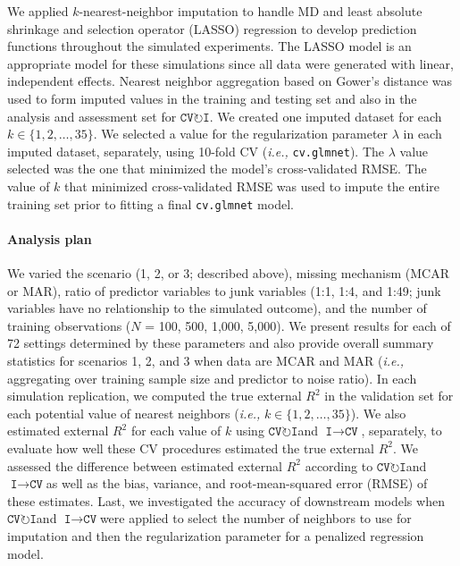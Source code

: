 \documentclass[AMA,STIX1COL,doublespace]{WileyNJD-v2}
\begin{document}
We applied \(k\)-nearest-neighbor imputation to handle MD and least
absolute shrinkage and selection operator (LASSO) regression to develop
prediction functions throughout the simulated
experiments.\cite{tibshirani1996regression} The LASSO model is an
appropriate model for these simulations since all data were generated
with linear, independent effects. Nearest neighbor aggregation based on
Gower's distance was used to form imputed values in the training and
testing set and also in the analysis and assessment set for
$\texttt{CV}\!\circlearrowright\!\texttt{I}$.\cite{gower1971general} We
created one imputed dataset for each
\(k \in \lbrace 1, 2, \ldots, 35\rbrace\). We selected a value for the
regularization parameter \(\lambda\) in each imputed dataset,
separately, using 10-fold CV
(\textit{i.e., }\texttt{cv.glmnet}).\cite{glmnet} The \(\lambda\) value
selected was the one that minimized the model's cross-validated RMSE.
The value of \(k\) that minimized cross-validated RMSE was used to
impute the entire training set prior to fitting a final
\texttt{cv.glmnet} model.

\paragraph{Analysis plan}

We varied the scenario (1, 2, or 3; described above), missing mechanism
(MCAR or MAR), ratio of predictor variables to junk variables (1:1, 1:4,
and 1:49; junk variables have no relationship to the simulated outcome),
and the number of training observations (\(N\) = 100, 500, 1,000,
5,000). We present results for each of 72 settings determined by these
parameters and also provide overall summary statistics for scenarios 1,
2, and 3 when data are MCAR and MAR (\textit{i.e., }aggregating over
training sample size and predictor to noise ratio). In each simulation
replication, we computed the true external \(R^2\) in the validation set
for each potential value of nearest neighbors
(\textit{i.e., }\(k \in \lbrace 1, 2, \ldots, 35 \rbrace\)). We also
estimated external \(R^2\) for each value of \(k\) using
$\texttt{CV}\!\circlearrowright\!\texttt{I}$\space and
$\texttt{I}\!\!\rightarrow\!\texttt{CV}$, separately, to evaluate how
well these CV procedures estimated the true external \(R^2\). We
assessed the difference between estimated external \(R^2\) according to
$\texttt{CV}\!\circlearrowright\!\texttt{I}$\space and
$\texttt{I}\!\!\rightarrow\!\texttt{CV}$\space as well as the bias,
variance, and root-mean-squared error (RMSE) of these estimates. Last,
we investigated the accuracy of downstream models when
$\texttt{CV}\!\circlearrowright\!\texttt{I}$\space and
$\texttt{I}\!\!\rightarrow\!\texttt{CV}$\space were applied to select
the number of neighbors to use for imputation and then the
regularization parameter for a penalized regression model.
\end{document}

